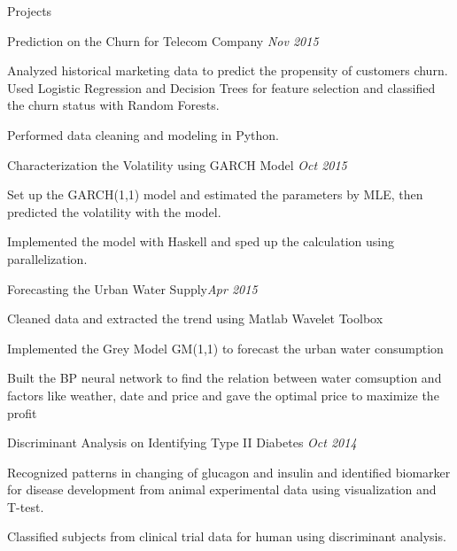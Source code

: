 \documentclass{resume} %
\begin{document}
\begin{rSection}{Projects}

\begin{rSubsection}{Prediction on the Churn for Telecom Company }{\em Nov 2015}{}{}
\item Analyzed historical marketing data to predict the propensity of customers churn. Used Logistic Regression and Decision Trees for feature selection and classified the churn status with Random Forests.
\item Performed data cleaning and modeling in Python.


\end{rSubsection}

\begin{rSubsection}{Characterization the Volatility using GARCH Model}{ \em Oct 2015}{}{}
\item Set up the GARCH(1,1) model and estimated the parameters by MLE, then predicted the volatility with the model.
\item Implemented the model with Haskell and sped up the calculation using parallelization.
\end{rSubsection}

\begin{rSubsection}{Forecasting the Urban Water Supply}{\em Apr 2015}{}{}
\item Cleaned data and extracted the trend using Matlab Wavelet Toolbox
\item Implemented the Grey Model GM(1,1) to forecast the urban water consumption
\item Built the BP neural network to find the relation between water comsuption and factors like weather, date and price and gave the optimal price to maximize the profit

\end{rSubsection}
\begin{rSubsection}{Discriminant Analysis on Identifying Type II Diabetes }{\em Oct 2014}{}{}
\item Recognized patterns in changing of glucagon and insulin and identified biomarker for disease development from animal experimental data using visualization and T-test.
\item Classified subjects from clinical trial data for human using discriminant analysis.
\end{rSubsection}

\end{rSection}
\end{document}
